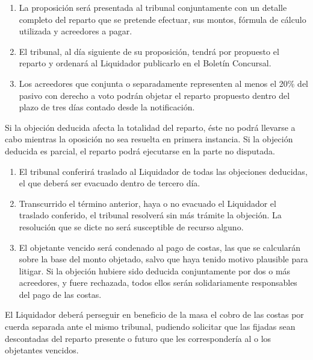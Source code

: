 \documentclass[
]{book}
\begin{document}
\begin{enumerate}
\def\labelenumi{\arabic{enumi})}
\item
  La proposición será presentada al tribunal conjuntamente con un detalle completo del reparto que se pretende efectuar, sus montos, fórmula de cálculo utilizada y acreedores a pagar.
\item
  El tribunal, al día siguiente de su proposición, tendrá por propuesto el reparto y ordenará al Liquidador publicarlo en el Boletín Concursal.
\item
  Los acreedores que conjunta o separadamente representen al menos el 20\% del pasivo con derecho a voto podrán objetar el reparto propuesto dentro del plazo de tres días contado desde la notificación.
\end{enumerate}

Si la objeción deducida afecta la totalidad del reparto, éste no podrá llevarse a cabo mientras la oposición no sea resuelta en primera instancia. Si la objeción deducida es parcial, el reparto podrá ejecutarse en la parte no disputada.

\begin{enumerate}
\def\labelenumi{\arabic{enumi})}
\setcounter{enumi}{3}
\item
  El tribunal conferirá traslado al Liquidador de todas las objeciones deducidas, el que deberá ser evacuado dentro de tercero día.
\item
  Transcurrido el término anterior, haya o no evacuado el Liquidador el traslado conferido, el tribunal resolverá sin más trámite la objeción. La resolución que se dicte no será susceptible de recurso alguno.
\item
  El objetante vencido será condenado al pago de costas, las que se calcularán sobre la base del monto objetado, salvo que haya tenido motivo plausible para litigar. Si la objeción hubiere sido deducida conjuntamente por dos o más acreedores, y fuere rechazada, todos ellos serán solidariamente responsables del pago de las costas.
\end{enumerate}

El Liquidador deberá perseguir en beneficio de la masa el cobro de las costas por cuerda separada ante el mismo tribunal, pudiendo solicitar que las fijadas sean descontadas del reparto presente o futuro que les correspondería al o los objetantes vencidos.
\end{document}
